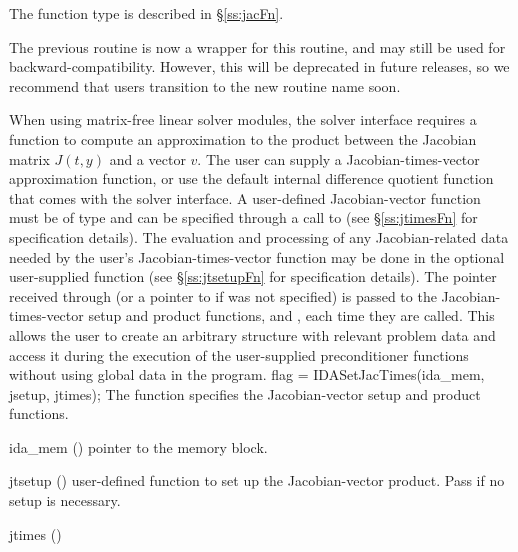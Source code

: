 {{  The function type  is described in \S\ref{ss:jacFn}.

  The previous routine  is now a wrapper for this
  routine, and may still be used for backward-compatibility.  However,
  this will be deprecated in future releases, so we recommend that
  users transition to the new routine name soon.
}
When using matrix-free linear solver modules, the {\idals} solver
interface requires a function to compute an approximation to the
product between the Jacobian matrix $J(t,y)$ and a vector $v$. The
user can supply a Jacobian-times-vector approximation function, 
or use the default internal difference quotient function
that comes with the {\idals} solver interface.  A user-defined
Jacobian-vector function must be of type  
and can be specified through a call to 
(see \S\ref{ss:jtimesFn} for specification details).
The evaluation and processing of any Jacobian-related data needed by
the user's Jacobian-times-vector function may be done in the optional
user-supplied function  (see \S\ref{ss:jtsetupFn} for
specification details).
The pointer  received through  (or a
pointer to  if  was not specified)
is passed to the Jacobian-times-vector setup and product functions,  and
, each time they are called.  This allows the user to
create an arbitrary structure with relevant problem data and access it
during the execution of the user-supplied preconditioner functions 
without using global data in the program.
{
  flag = IDASetJacTimes(ida\_mem, jsetup, jtimes);
}
{
  The function  specifies the Jacobian-vector
  setup and product functions.
}
{
  \begin{args}
  \item[ida\_mem] ()
    pointer to the {\idas} memory block.
  \item[jtsetup] ()
    user-defined function to set up the Jacobian-vector product.
    Pass  if no setup is necessary.
  \item[jtimes] ()

\end{args}}}
